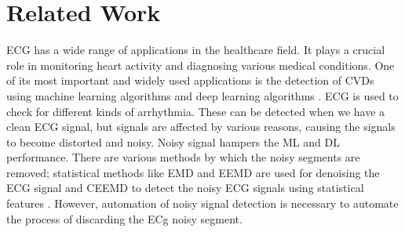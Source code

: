 \section{Related Work}
ECG has a wide range of applications in the healthcare field. It plays a crucial role in monitoring heart activity and diagnosing various medical conditions. One of its most important and widely used applications is the detection of CVDs using machine learning algorithms \cite{7164783} and deep learning algorithms \cite{smigiel2021ecg,9991600}. ECG is used to check for different kinds of arrhythmia. These can be detected when we have a clean ECG signal, but signals are affected by various reasons, causing the signals to become distorted and noisy. Noisy signal hampers the ML and DL performance. There are various methods by which the noisy segments are removed; statistical methods like EMD and EEMD are used for denoising the ECG signal \cite{kabir2012denoising} and CEEMD to detect the noisy ECG signals using statistical features \cite{satija2017automated}. However, automation of noisy signal detection is necessary to automate the process of discarding the ECg noisy segment. 



